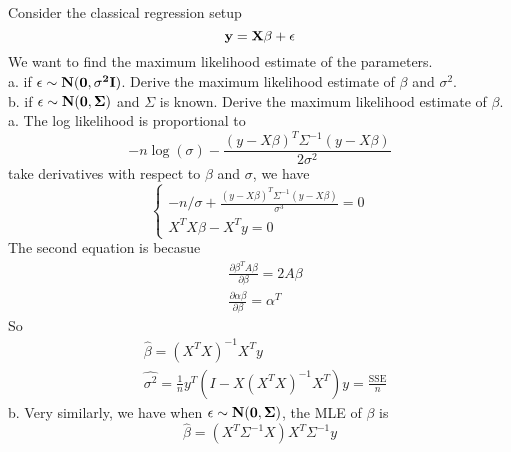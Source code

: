 \documentclass[12pt]{article}
\begin{document}
 {
Consider the classical regression setup
\[\bf{y}=\bf{X}\bf{\beta}+\bf{\epsilon}\]
We want to find the maximum likelihood estimate of the parameters.\\
a. if $\bf{\epsilon}\sim N(\bf{0},\sigma^2\bf{I})$. Derive the maximum likelihood estimate of $\beta$ and $\sigma^2$.\\
b. if $\bf{\epsilon}\sim N(\bf{0},\Sigma)$ and $\Sigma$ is known. Derive the maximum likelihood estimate of $\beta$.
}
{ \vfill
  \answer
}{ 
  a. The log likelihood is proportional to
  \[-n\log(\sigma)-\frac{(y-X\beta)^T\Sigma^{-1}(y-X\beta)}{2\sigma^2}\]
  take derivatives with respect to $\beta$ and $\sigma$, we have 
  \[\left\{
    \begin{array}{l}  -n/\sigma+\frac{(y-X\beta)^T\Sigma^{-1}(y-X\beta)}{\sigma^3}=0\\
      X^TX\beta-X^Ty=0
     \end{array} \right. \]
  The second equation is becasue
  \begin{align*}
    &\frac{\partial\beta^TA\beta}{\partial \beta}=2A\beta\\
    &\frac{\partial \alpha\beta}{\partial\beta}=\alpha^T
  \end{align*}
  So 
  \begin{align*}
   &\hat{\beta}=(X^TX)^{-1}X^Ty\\
   &\hat{\sigma^2}=\frac{1}{n}y^T(I-X(X^TX)^{-1}X^T)y=\frac{\text{SSE}}{n}
  \end{align*}
b. Very similarly, we have when $\bf{\epsilon}\sim N(\bf{0},\Sigma)$, the MLE of $\beta$ is 
\[\hat{\beta}=(X^T\Sigma^{-1}X)X^T\Sigma^{-1}y\]
}
\end{document}
